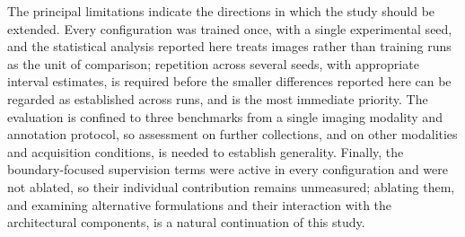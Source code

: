The principal limitations indicate the directions in which the study should be extended. Every configuration was trained once, with a single experimental seed, and the statistical analysis reported here treats images rather than training runs as the unit of comparison; repetition across several seeds, with appropriate interval estimates, is required before the smaller differences reported here can be regarded as established across runs, and is the most immediate priority. The evaluation is confined to three benchmarks from a single imaging modality and annotation protocol, so assessment on further collections, and on other modalities and acquisition conditions, is needed to establish generality. Finally, the boundary-focused supervision terms were active in every configuration and were not ablated, so their individual contribution remains unmeasured; ablating them, and examining alternative formulations and their interaction with the architectural components, is a natural continuation of this study.
